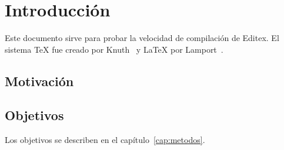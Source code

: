 \chapter{Introducción}
\label{cap:intro}

Este documento sirve para probar la velocidad de compilación de Editex.
El sistema \TeX{} fue creado por Knuth~\cite{knuth1984} y \LaTeX{} por Lamport~\cite{lamport1994}.

\section{Motivación}
\lipsum[1-6]

\section{Objetivos}
Los objetivos se describen en el capítulo~\ref{cap:metodos}.
\lipsum[7-12]
